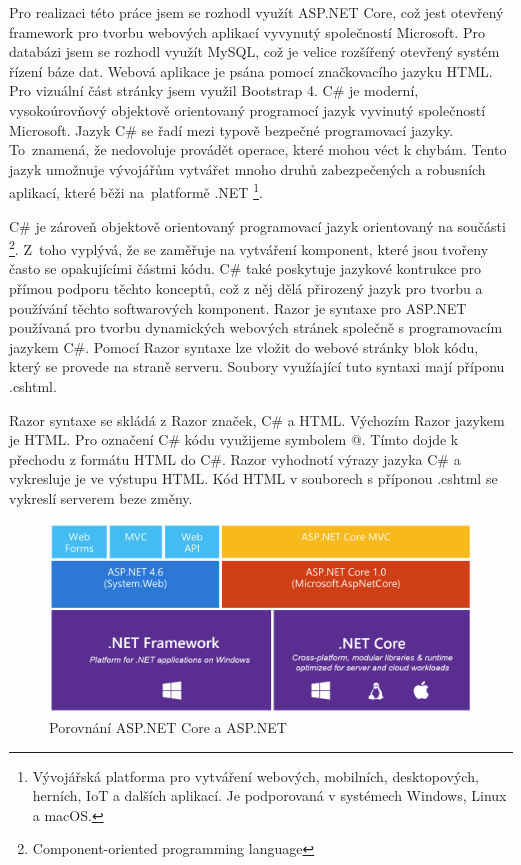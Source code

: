 \documentclass[a4paper, 12pt]{report}
\begin{document}
    Pro realizaci této práce jsem se rozhodl využít ASP.NET Core, což jest otevřený framework pro tvorbu webových aplikací vyvynutý společností Microsoft.
    Pro databázi jsem se rozhodl využít MySQL, což je velice rozšířený otevřený systém řízení báze dat. Webová aplikace je psána pomocí značkovacího
    jazyku HTML. Pro vizuální část stránky jsem využil Bootstrap 4.
        C\# je moderní, vysokoúrovňový objektově orientovaný programocí jazyk vyvinutý společností Microsoft. Jazyk C\# se řadí mezi typově bezpečné
        programovací jazyky. To~znamená, že nedovoluje provádět operace, které mohou véct k chybám. Tento jazyk umožnuje vývojářům vytvářet mnoho
        druhů zabezpečených a robusních aplikací, které běži na~platformě .NET \footnote{Vývojářská platforma pro vytváření webových, mobilních,
        desktopových, herních, IoT a dalších aplikací. Je podporovaná v systémech Windows, Linux a macOS.}.\par
        C\# je zároveň objektově orientovaný programovací jazyk orientovaný na součásti \footnote{Component-oriented programming language}. Z~toho vyplývá,
        že se zaměřuje na vytváření komponent, které jsou tvořeny často se opakujícími částmi kódu. C\# také poskytuje jazykové kontrukce pro přímou
        podporu těchto konceptů, což z něj dělá přirozený jazyk pro tvorbu a používání těchto softwarových komponent.\cite{CSharp}
		Razor je syntaxe pro ASP.NET používaná pro tvorbu dynamických webových stránek společně s programovacím jazykem C\#. Pomocí Razor syntaxe lze
        vložit do webové stránky blok kódu, který se provede na straně serveru. Soubory využíající tuto syntaxi mají příponu .cshtml.\par
		Razor syntaxe se skládá z Razor značek, C\# a HTML. Výchozím Razor jazykem je HTML. Pro označení C\# kódu využijeme symbolem @. Tímto dojde
        k přechodu z formátu HTML do C\#. Razor vyhodnotí výrazy jazyka C\# a vykresluje je ve výstupu HTML. Kód HTML v souborech s příponou .cshtml
        se vykreslí serverem beze změny.\cite{Razor}
			\begin{figure}[h!]
				\includegraphics[width=\textwidth]{aspnetcore_aspnet}
				\caption{Porovnání ASP.NET Core a ASP.NET \cite{ASPNETCORE_ASPNET}}
				\label{ASP.NET Core a ASP.NET}
			\end{figure}
\end{document}
